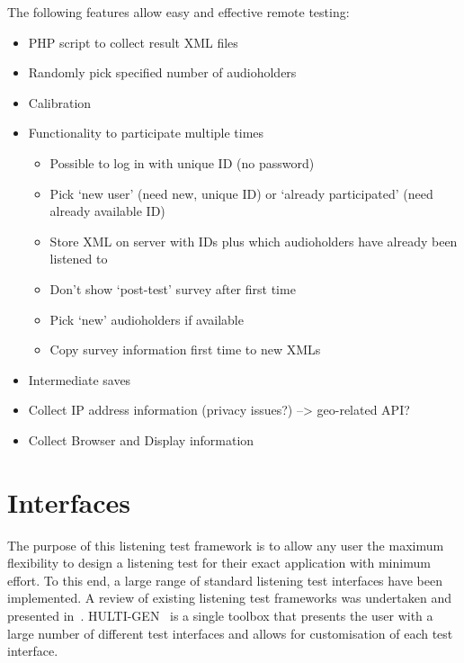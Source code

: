 \documentclass{sig-alternate}
\begin{document}
	The following features allow easy and effective remote testing: 
	\begin{itemize}[noitemsep,nolistsep]
		\item PHP script to collect result XML files
		\item Randomly pick specified number of audioholders
		\item Calibration
		\item Functionality to participate multiple times
			\begin{itemize}[noitemsep,nolistsep]
				\item Possible to log in with unique ID (no password)
				\item Pick `new user' (need new, unique ID) or `already participated' (need already available ID)
				\item Store XML on server with IDs plus which audioholders have already been listened to
				\item Don't show `post-test' survey after first time
				\item Pick `new' audioholders if available
				\item Copy survey information first time to new XMLs
			\end{itemize}
		\item Intermediate saves
		\item Collect IP address information (privacy issues?) --> geo-related API?
		\item Collect Browser and Display information 
	\end{itemize}

	
\section{Interfaces} %

The purpose of this listening test framework is to allow any user the maximum flexibility to design a listening test for their exact application with minimum effort. To this end, a large range of standard listening test interfaces have been implemented. A review of existing listening test frameworks was undertaken and presented in~. HULTI-GEN~\cite{hultigen} is a single toolbox that presents the user with a large number of different test interfaces and allows for customisation of each test interface.
\end{document}
